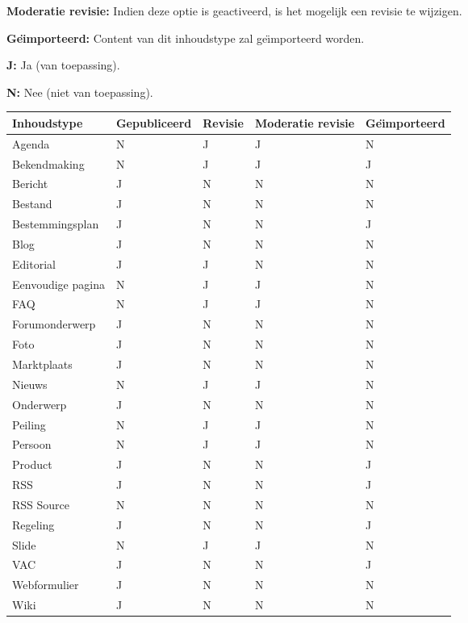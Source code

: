 \textbf{Moderatie revisie:} Indien deze optie is geactiveerd, is het mogelijk een revisie te wijzigen.

\textbf{Ge{\"\i}mporteerd:} Content van dit inhoudstype zal ge{\"\i}mporteerd worden.

\textbf{J:} Ja (van toepassing).

\textbf{N:} Nee (niet van toepassing).

\begin{tabularx}{\textwidth}{ | p{5cm} |X|X|X|X| }
  \hline
  Inhoudstype & Gepubliceerd & Revisie & Moderatie revisie & Ge{\"\i}mporteerd \\ \hline
  Agenda & N & J  & J & N  \\ \hline
  Bekendmaking & N & J  & J & J  \\ \hline
  Bericht  & J & N  & N & N  \\ \hline
  Bestand  & J & N  & N & N  \\ \hline
  Bestemmingsplan  & J & N  & N & J  \\ \hline
  Blog  & J & N  & N & N  \\ \hline
  Editorial  & J & J  & N & N  \\ \hline
  Eenvoudige pagina  & N & J  & J & N  \\ \hline
  FAQ  & N & J  & J & N  \\ \hline
  Forumonderwerp  & J & N  & N & N  \\ \hline
  Foto  & J & N  & N & N  \\ \hline
  Marktplaats  & J & N  & N & N  \\ \hline
  Nieuws  & N & J  & J & N  \\ \hline
  Onderwerp  & J & N  & N & N  \\ \hline
  Peiling  & N & J  & J & N  \\ \hline
  Persoon  & N & J  & J & N  \\ \hline
  Product  & J & N  & N & J  \\ \hline
  RSS  & J & N  & N & J  \\ \hline
  RSS Source  & N & N  & N & N  \\ \hline
  Regeling  & J & N  & N & J  \\ \hline
  Slide  & N & J  & J & N  \\ \hline
  VAC  & J & N  & N & J  \\ \hline
  Webformulier  & J & N  & N & N  \\ \hline
  Wiki  & J & N  & N & N  \\ \hline
\end{tabularx}

